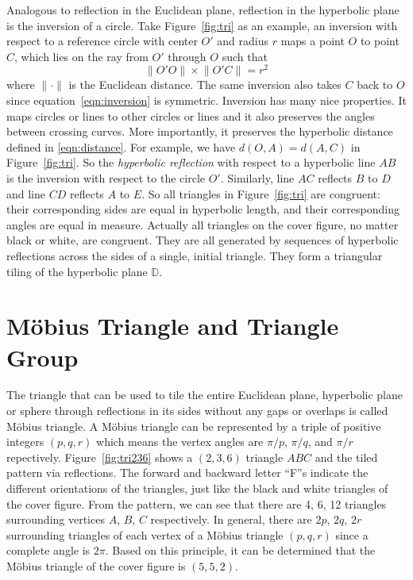 \documentclass[12pt]{article}
\begin{document}
Analogous to reflection in the Euclidean plane, reflection in the
hyperbolic plane is the inversion of a circle. Take
Figure~\ref{fig:tri} as an example, an inversion with respect to a
reference circle with center $O'$ and radius $r$ maps a point $O$ to
point $C$, which lies on the ray from $O'$ through $O$ such that
\begin{equation}\label{eqn:inversion}
  \lVert O'O \rVert \times \lVert O'C \rVert= r^2
\end{equation}
where $\lVert \cdot \rVert$ is the Euclidean distance. The same
inversion also takes $C$ back to $O$ since
equation~\eqref{eqn:inversion} is symmetric. Inversion has many nice
properties. It maps circles or lines to other circles or lines and it
also preserves the angles between crossing curves. More importantly,
it preserves the hyperbolic distance defined in
\eqref{eqn:distance}. For example, we have $d(O, A)=d(A, C)$ in
Figure~\ref{fig:tri}. So the \emph{hyperbolic reflection} with respect
to a hyperbolic line $AB$ is the inversion with respect to the circle
$O'$. Similarly, line $AC$ reflects $B$ to $D$ and line $CD$ reflects
$A$ to $E$. So all triangles in Figure~\ref{fig:tri} are congruent:
their corresponding sides are equal in hyperbolic length, and their
corresponding angles are equal in measure. Actually all triangles on
the cover figure, no matter black or white, are congruent. They are
all generated by sequences of hyperbolic reflections across the sides
of a single, initial triangle. They form a triangular tiling of the
hyperbolic plane $\mathbb{D}$.

\section{M\"obius Triangle and Triangle Group}

The triangle that can be used to tile the entire Euclidean plane,
hyperbolic plane or sphere through reflections in its sides without
any gaps or overlaps is called M\"obius triangle. A M\"obius triangle
can be represented by a triple of positive integers $(p, q, r)$ which
means the vertex angles are $\pi/p$, $\pi/q$, and $\pi/r$
repectively. Figure~\ref{fig:tri236} shows a $(2, 3, 6)$ triangle
$ABC$ and the tiled pattern via reflections. The forward and backward
letter ``F''s indicate the different orientations of the triangles,
just like the black and white triangles of the cover figure. From the
pattern, we can see that there are 4, 6, 12 triangles surrounding
vertices $A$, $B$, $C$ respectively. In general, there are $2p$, $2q$,
$2r$ surrounding triangles of each vertex of a M\"obius triangle $(p,
q, r)$ since a complete angle is $2\pi$. Based on this principle, it
can be determined that the M\"obius triangle of the cover figure is
$(5, 5, 2)$.
\end{document}

